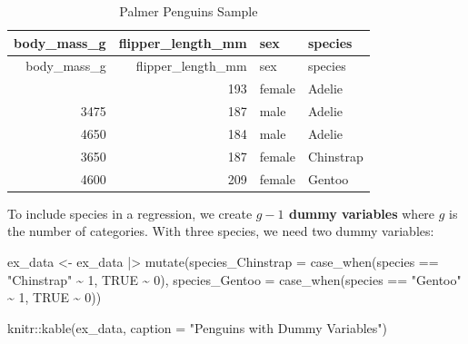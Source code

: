\documentclass[
  letterpaper,
  DIV=11,
  numbers=noendperiod]{scrreprt}
\newenvironment{Shaded}{\begin{snugshade}}{\end{snugshade}}
\newcommand{\AttributeTok}[1]{\textcolor[rgb]{0.40,0.45,0.13}{#1}}
\newcommand{\ConstantTok}[1]{\textcolor[rgb]{0.56,0.35,0.01}{#1}}
\newcommand{\DecValTok}[1]{\textcolor[rgb]{0.68,0.00,0.00}{#1}}
\newcommand{\FunctionTok}[1]{\textcolor[rgb]{0.28,0.35,0.67}{#1}}
\newcommand{\NormalTok}[1]{\textcolor[rgb]{0.00,0.23,0.31}{#1}}
\newcommand{\OtherTok}[1]{\textcolor[rgb]{0.00,0.23,0.31}{#1}}
\newcommand{\SpecialCharTok}[1]{\textcolor[rgb]{0.37,0.37,0.37}{#1}}
\newcommand{\StringTok}[1]{\textcolor[rgb]{0.13,0.47,0.30}{#1}}
\begin{document}
\begin{longtable}[]{@{}rrll@{}}
\caption{Palmer Penguins Sample}\tabularnewline
\toprule\noalign{}
body\_mass\_g & flipper\_length\_mm & sex & species \\
\midrule\noalign{}
\endfirsthead
\toprule\noalign{}
body\_mass\_g & flipper\_length\_mm & sex & species \\
\midrule\noalign{}
\endhead
\bottomrule\noalign{}
\endlastfoot
3450 & 193 & female & Adelie \\
3475 & 187 & male & Adelie \\
4650 & 184 & male & Adelie \\
3650 & 187 & female & Chinstrap \\
4600 & 209 & female & Gentoo \\
\end{longtable}

To include species in a regression, we create \textbf{\(g - 1\) dummy
variables} where \(g\) is the number of categories. With three species,
we need two dummy variables:

\begin{Shaded}
\begin{Highlighting}[]
\NormalTok{ex\_data }\OtherTok{\textless{}{-}}\NormalTok{ ex\_data }\SpecialCharTok{|\textgreater{}} 
    \FunctionTok{mutate}\NormalTok{(}\AttributeTok{species\_Chinstrap =} \FunctionTok{case\_when}\NormalTok{(species }\SpecialCharTok{==} \StringTok{"Chinstrap"} \SpecialCharTok{\textasciitilde{}} \DecValTok{1}\NormalTok{, }\ConstantTok{TRUE} \SpecialCharTok{\textasciitilde{}} \DecValTok{0}\NormalTok{),}
           \AttributeTok{species\_Gentoo =} \FunctionTok{case\_when}\NormalTok{(species }\SpecialCharTok{==} \StringTok{"Gentoo"} \SpecialCharTok{\textasciitilde{}} \DecValTok{1}\NormalTok{, }\ConstantTok{TRUE} \SpecialCharTok{\textasciitilde{}} \DecValTok{0}\NormalTok{))}

\NormalTok{knitr}\SpecialCharTok{::}\FunctionTok{kable}\NormalTok{(ex\_data, }\AttributeTok{caption =} \StringTok{"Penguins with Dummy Variables"}\NormalTok{)}
\end{Highlighting}
\end{Shaded}
\end{document}
